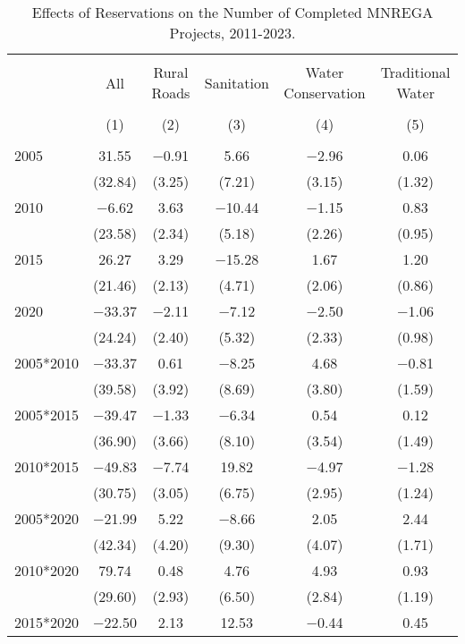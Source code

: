 
\begin{table}[!htbp] \centering 
  \caption{Effects of Reservations on the Number of Completed MNREGA Projects, 2011-2023.} 
  \label{main_mnrega_2011_2023_all} 
\scriptsize 
\begin{tabular}{@{\extracolsep{1pt}}lccccc} 
\\[-1.8ex]\hline 
\hline \\[-1.8ex] 
 & All & Rural Roads & Sanitation & Water Conservation & Traditional Water \\ 
\\[-1.8ex] & (1) & (2) & (3) & (4) & (5)\\ 
\hline \\[-1.8ex] 
 2005 & 31.55 & $-$0.91 & 5.66 & $-$2.96 & 0.06 \\ 
  & (32.84) & (3.25) & (7.21) & (3.15) & (1.32) \\ 
  2010 & $-$6.62 & 3.63 & $-$10.44 & $-$1.15 & 0.83 \\ 
  & (23.58) & (2.34) & (5.18) & (2.26) & (0.95) \\ 
  2015 & 26.27 & 3.29 & $-$15.28 & 1.67 & 1.20 \\ 
  & (21.46) & (2.13) & (4.71) & (2.06) & (0.86) \\ 
  2020 & $-$33.37 & $-$2.11 & $-$7.12 & $-$2.50 & $-$1.06 \\ 
  & (24.24) & (2.40) & (5.32) & (2.33) & (0.98) \\ 
  2005*2010 & $-$33.37 & 0.61 & $-$8.25 & 4.68 & $-$0.81 \\ 
  & (39.58) & (3.92) & (8.69) & (3.80) & (1.59) \\ 
  2005*2015 & $-$39.47 & $-$1.33 & $-$6.34 & 0.54 & 0.12 \\ 
  & (36.90) & (3.66) & (8.10) & (3.54) & (1.49) \\ 
  2010*2015 & $-$49.83 & $-$7.74 & 19.82 & $-$4.97 & $-$1.28 \\ 
  & (30.75) & (3.05) & (6.75) & (2.95) & (1.24) \\ 
  2005*2020 & $-$21.99 & 5.22 & $-$8.66 & 2.05 & 2.44 \\ 
  & (42.34) & (4.20) & (9.30) & (4.07) & (1.71) \\ 
  2010*2020 & 79.74 & 0.48 & 4.76 & 4.93 & 0.93 \\ 
  & (29.60) & (2.93) & (6.50) & (2.84) & (1.19) \\ 
  2015*2020 & $-$22.50 & 2.13 & 12.53 & $-$0.44 & 0.45 \\ 

\end{tabular}
\end{table}
